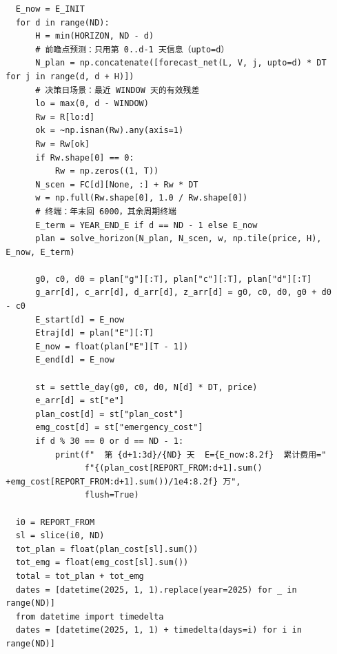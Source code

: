 \begin{verbatim}
    E_now = E_INIT
    for d in range(ND):
        H = min(HORIZON, ND - d)
        # 前瞻点预测：只用第 0..d-1 天信息（upto=d）
        N_plan = np.concatenate([forecast_net(L, V, j, upto=d) * DT
  for j in range(d, d + H)])
        # 决策日场景：最近 WINDOW 天的有效残差
        lo = max(0, d - WINDOW)
        Rw = R[lo:d]
        ok = ~np.isnan(Rw).any(axis=1)
        Rw = Rw[ok]
        if Rw.shape[0] == 0:
            Rw = np.zeros((1, T))
        N_scen = FC[d][None, :] + Rw * DT
        w = np.full(Rw.shape[0], 1.0 / Rw.shape[0])
        # 终端：年末回 6000，其余周期终端
        E_term = YEAR_END_E if d == ND - 1 else E_now
        plan = solve_horizon(N_plan, N_scen, w, np.tile(price, H),
  E_now, E_term)

        g0, c0, d0 = plan["g"][:T], plan["c"][:T], plan["d"][:T]
        g_arr[d], c_arr[d], d_arr[d], z_arr[d] = g0, c0, d0, g0 + d0
  - c0
        E_start[d] = E_now
        Etraj[d] = plan["E"][:T]
        E_now = float(plan["E"][T - 1])
        E_end[d] = E_now

        st = settle_day(g0, c0, d0, N[d] * DT, price)
        e_arr[d] = st["e"]
        plan_cost[d] = st["plan_cost"]
        emg_cost[d] = st["emergency_cost"]
        if d % 30 == 0 or d == ND - 1:
            print(f"  第 {d+1:3d}/{ND} 天  E={E_now:8.2f}  累计费用="
                  f"{(plan_cost[REPORT_FROM:d+1].sum()
  +emg_cost[REPORT_FROM:d+1].sum())/1e4:8.2f} 万",
                  flush=True)

    i0 = REPORT_FROM
    sl = slice(i0, ND)
    tot_plan = float(plan_cost[sl].sum())
    tot_emg = float(emg_cost[sl].sum())
    total = tot_plan + tot_emg
    dates = [datetime(2025, 1, 1).replace(year=2025) for _ in
  range(ND)]
    from datetime import timedelta
    dates = [datetime(2025, 1, 1) + timedelta(days=i) for i in
  range(ND)]


\end{verbatim}
